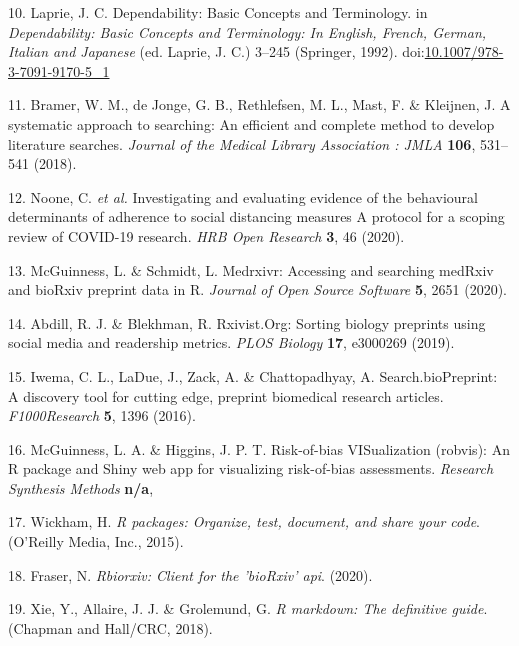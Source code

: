 \documentclass[a4paper, twoside]{templates/ociamthesis}
\begin{document}
\leavevmode\hypertarget{ref-laprie1992}{}%
10. Laprie, J. C. Dependability: Basic Concepts and Terminology. in \emph{Dependability: Basic Concepts and Terminology: In English, French, German, Italian and Japanese} (ed. Laprie, J. C.) 3--245 (Springer, 1992). doi:\href{https://doi.org/10.1007/978-3-7091-9170-5_1}{10.1007/978-3-7091-9170-5\_1}

\leavevmode\hypertarget{ref-bramer2018}{}%
11. Bramer, W. M., de Jonge, G. B., Rethlefsen, M. L., Mast, F. \& Kleijnen, J. A systematic approach to searching: An efficient and complete method to develop literature searches. \emph{Journal of the Medical Library Association : JMLA} \textbf{106}, 531--541 (2018).

\leavevmode\hypertarget{ref-noone2020}{}%
12. Noone, C. \emph{et al.} Investigating and evaluating evidence of the behavioural determinants of adherence to social distancing measures A protocol for a scoping review of COVID-19 research. \emph{HRB Open Research} \textbf{3}, 46 (2020).

\leavevmode\hypertarget{ref-mcguinness2020a}{}%
13. McGuinness, L. \& Schmidt, L. Medrxivr: Accessing and searching medRxiv and bioRxiv preprint data in R. \emph{Journal of Open Source Software} \textbf{5}, 2651 (2020).

\leavevmode\hypertarget{ref-abdill2019}{}%
14. Abdill, R. J. \& Blekhman, R. Rxivist.Org: Sorting biology preprints using social media and readership metrics. \emph{PLOS Biology} \textbf{17}, e3000269 (2019).

\leavevmode\hypertarget{ref-iwema2016}{}%
15. Iwema, C. L., LaDue, J., Zack, A. \& Chattopadhyay, A. Search.bioPreprint: A discovery tool for cutting edge, preprint biomedical research articles. \emph{F1000Research} \textbf{5}, 1396 (2016).

\leavevmode\hypertarget{ref-mcguinness}{}%
16. McGuinness, L. A. \& Higgins, J. P. T. Risk-of-bias VISualization (robvis): An R package and Shiny web app for visualizing risk-of-bias assessments. \emph{Research Synthesis Methods} \textbf{n/a},

\leavevmode\hypertarget{ref-wickham2015r}{}%
17. Wickham, H. \emph{R packages: Organize, test, document, and share your code}. (O'Reilly Media, Inc., 2015).

\leavevmode\hypertarget{ref-rbiorxiv}{}%
18. Fraser, N. \emph{Rbiorxiv: Client for the 'bioRxiv' api}. (2020).

\leavevmode\hypertarget{ref-xie2018r}{}%
19. Xie, Y., Allaire, J. J. \& Grolemund, G. \emph{R markdown: The definitive guide}. (Chapman and Hall/CRC, 2018).
\end{document}
